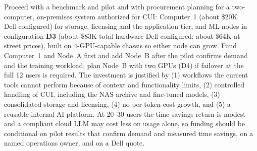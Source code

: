 
Proceed with a benchmark and pilot and with procurement planning for a two-computer,
on-premises system authorized for CUI: Computer~1 (about \$20K Dell-configured) for
storage, licensing and the application tier, and ML nodes in configuration \textbf{D3}
(about \$83K total hardware Dell-configured; about \$64K at street prices), built on
4-GPU-capable chassis so either node can grow. Fund Computer~1 and Node~A first and add
Node~B after the pilot confirms demand and the training workload; plan Node~B with two
GPUs (D4) if failover at the full 12 users is required. The investment is justified by
(1) workflows the current tools cannot perform because of context and functionality
limits, (2) controlled handling of CUI, including the NAS archive and fine-tuned models,
(3) consolidated storage and licensing, (4) no per-token cost growth, and (5) a reusable
internal AI platform. At 20--30 users the time-savings return is modest and a compliant
cloud LLM may cost less on usage alone, so funding should be conditional on pilot results
that confirm demand and measured time savings, on a named operations owner, and on a
Dell quote.
